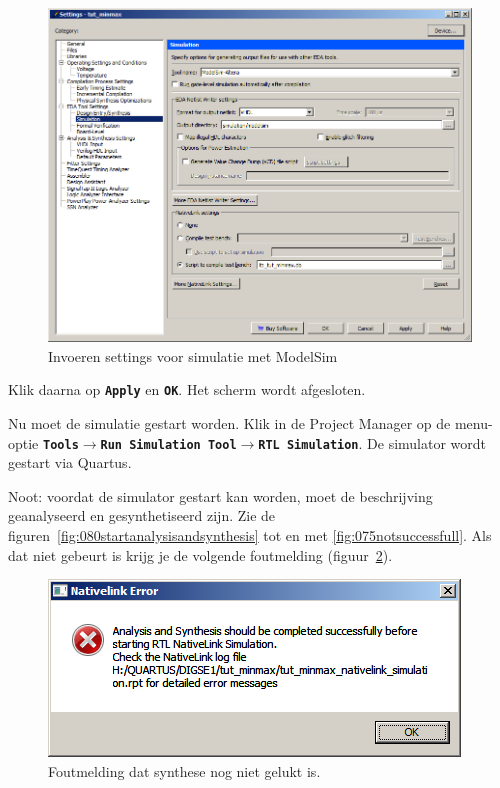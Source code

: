 \documentclass[a4paper,12pt,fleqn,twoside]{book}
\def\tutpicscale{0.455}
\newcommand{\menu}[1]{\texttt{\textbf{#1}}}
\def\pijl{$\rightarrow$}%
\begin{document}
\begin{figure}[H]
\centering
\includegraphics[scale=\tutpicscale]{073settingssimulation.png}
\caption{Invoeren settings voor simulatie met ModelSim}
\label{fig:073settingssimulation}
\end{figure} 

Klik daarna op \menu{Apply} en \menu{OK}. Het scherm wordt afgesloten.

Nu moet de simulatie gestart worden. Klik in de Project Manager op de menu-optie 
\menu{Tools\pijl{}Run Simulation Tool\pijl{}RTL Simulation}. De simulator wordt gestart via 
Quartus. 

Noot: voordat de simulator gestart kan worden, moet de beschrijving geanalyseerd en 
gesynthetiseerd zijn. Zie de figuren~\ref{fig:080startanalysisandsynthesis} tot en met
\ref{fig:075notsuccessfull}. Als dat niet gebeurt is krijg je de volgende 
foutmelding (figuur~\ref{fig:077nativelinkneedssynthesis}).

\begin{figure}[H]
\centering
\includegraphics[scale=\tutpicscale]{077nativelinkneedssynthesis.png}
\caption{Foutmelding dat synthese nog niet gelukt is.}
\label{fig:077nativelinkneedssynthesis}
\end{figure} 
\end{document}
